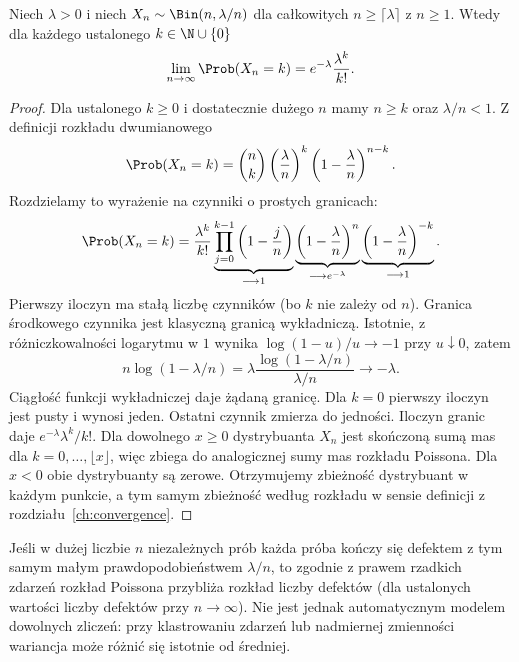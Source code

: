\begin{twierdzenie}
Niech $\lambda>0$ i niech $X_n\sim\Bin(n,\lambda/n)$
dla całkowitych $n\geq\lceil\lambda\rceil$ z $n\geq1$.
Wtedy dla każdego ustalonego $k\in\N\cup\{0\}$
\[
\lim_{n\to\infty}\Prob(X_n=k)
=e^{-\lambda}\frac{\lambda^k}{k!}.
\]
\end{twierdzenie}
\begin{proof}
Dla ustalonego $k\geq0$ i dostatecznie dużego $n$
mamy $n\geq k$ oraz $\lambda/n<1$. Z definicji
rozkładu dwumianowego
\[
\Prob(X_n=k)=\binom nk\left(\frac\lambda n\right)^k
\left(1-\frac\lambda n\right)^{n-k}.
\]
Rozdzielamy to wyrażenie na czynniki o prostych granicach:
\[
\Prob(X_n=k)=\frac{\lambda^k}{k!}
\underbrace{\prod_{j=0}^{k-1}\left(1-\frac jn\right)}_{\longrightarrow1}
\underbrace{\left(1-\frac\lambda n\right)^n}_{\longrightarrow e^{-\lambda}}
\underbrace{\left(1-\frac\lambda n\right)^{-k}}_{\longrightarrow1}.
\]
Pierwszy iloczyn ma stałą liczbę czynników (bo $k$ nie
zależy od $n$). Granica środkowego czynnika jest
klasyczną granicą wykładniczą. Istotnie, z różniczkowalności
logarytmu w $1$ wynika $\log(1-u)/u\to-1$ przy $u\downarrow0$,
zatem
\[
n\log(1-\lambda/n)=\lambda\frac{\log(1-\lambda/n)}{\lambda/n}
\longrightarrow-\lambda.
\]
Ciągłość funkcji wykładniczej daje żądaną granicę.
Dla $k=0$ pierwszy iloczyn jest pusty i wynosi jeden.
Ostatni czynnik zmierza do jedności.
Iloczyn granic daje $e^{-\lambda}\lambda^k/k!$.
Dla dowolnego $x\geq0$ dystrybuanta $X_n$ jest
skończoną sumą mas dla $k=0,\ldots,\lfloor x\rfloor$,
więc zbiega do analogicznej sumy mas rozkładu Poissona.
Dla $x<0$ obie dystrybuanty są zerowe.
Otrzymujemy zbieżność dystrybuant w każdym punkcie,
a tym samym zbieżność według rozkładu w sensie
definicji z rozdziału~\ref{ch:convergence}.
\end{proof}

\begin{przyklad}
Jeśli w dużej liczbie $n$ niezależnych prób każda próba
kończy się defektem z tym samym małym prawdopodobieństwem
$\lambda/n$, to zgodnie z prawem rzadkich zdarzeń
rozkład Poissona przybliża rozkład liczby defektów
(dla ustalonych wartości liczby defektów przy $n\to\infty$).
Nie jest jednak automatycznym modelem dowolnych zliczeń:
przy klastrowaniu zdarzeń lub nadmiernej zmienności
wariancja może różnić się istotnie od średniej.
\end{przyklad}

